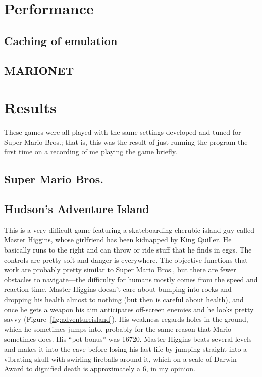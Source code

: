 \documentclass[twocolumn]{article}
\begin{document}
\section{Performance} \label{sec:performance}

\subsection{Caching of emulation} \label{sec:caching}

\subsection{MARIONET}


\section{Results} \label{sec:results}

These games were all played with the same settings developed and tuned
for Super Mario Bros.; that is, this was the result of just running
the program the first time on a recording of me playing the game
briefly.

\subsection{Super Mario Bros.}



\subsection{Hudson's Adventure Island}

This is a very difficult game featuring a skateboarding cherubic
island guy called Master Higgins, whose girlfriend has been kidnapped
by King Quiller. He basically runs to the right and can throw or ride
stuff that he finds in eggs. The controls are pretty soft and danger
is everywhere. The objective functions that work are probably pretty
similar to Super Mario Bros., but there are fewer obstacles to
navigate---the difficulty for humans mostly comes from the speed and
reaction time. Master Higgins doesn't care about bumping into rocks
and dropping his health almost to nothing (but then is careful about
health), and once he gets a weapon his aim anticipates off-screen
enemies and he looks pretty savvy (Figure~\ref{fig:adventureisland}).
His weakness regards holes in the ground, which he sometimes jumps
into, probably for the same reason that Mario sometimes does. His
``pot bonus'' was 16720. Master Higgins beats several levels and makes
it into the cave before losing his last life by jumping straight into
a vibrating skull with swirling fireballs around it, which on a scale
of Darwin Award to dignified death is approximately a 6, in my
opinion.
\end{document}
